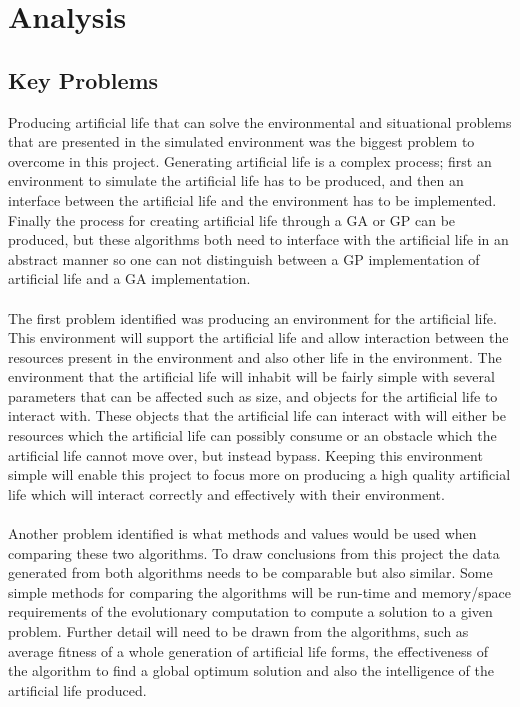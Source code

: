 \documentclass[12pt]{article}
\begin{document}
\section{Analysis}

\subsection{Key Problems}
Producing artificial life that can solve the environmental and situational problems that are presented in the simulated environment 
was the biggest problem to overcome in this project. Generating artificial life is a complex process; first an environment to simulate the artificial life has to be produced, and then
an interface between the artificial life and the environment has to be implemented. Finally the process for creating artificial life through a GA or GP can be produced, but these algorithms
both need to interface with the artificial life in an abstract manner so one can not distinguish between a GP implementation of artificial life and a GA implementation.

\paragraph{}
The first problem identified was producing an environment for the artificial life. This environment will support the artificial life and allow interaction between the resources present
in the environment and also other life in the environment. The environment that the artificial life will inhabit will be fairly simple with several parameters that can be affected such as
size, and objects for the artificial life to interact with. These objects that the artificial life can interact with will either be resources which the artificial life can possibly consume
or an obstacle which the artificial life cannot move over, but instead bypass. Keeping this environment simple will enable this project to focus more on producing a high quality artificial life
which will interact correctly and effectively with their environment. 

\paragraph{}
Another problem identified is what methods and values would be used when comparing these two algorithms. To draw conclusions from this project the data generated from both algorithms needs 
to be comparable but also similar.
Some simple methods for comparing the algorithms will be run-time and memory/space requirements of the evolutionary computation to compute a solution to a given problem.
Further detail will need to
be drawn from the algorithms, such as average fitness of a whole generation of artificial life forms, the effectiveness of the algorithm to find a global optimum solution and also the
intelligence of the artificial life produced. 
\end{document}
